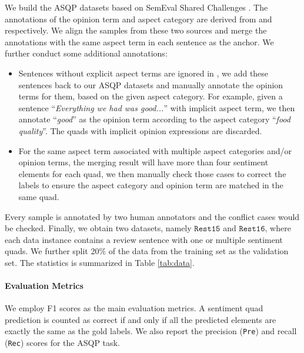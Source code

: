\documentclass[11pt]{article}
\begin{document}
We build the ASQP datasets based on SemEval Shared Challenges \cite{semeval15-absa, semeval16-absa}. The annotations of the opinion term and aspect category are derived from \citet{aaai20-robin} and \citet{aaai20-tasd} respectively. We align the samples from these two sources and merge the annotations with the same aspect term in each sentence as the anchor. We further conduct some additional annotations:
\begin{itemize}[leftmargin=*]
    \setlength{\itemsep}{0pt}
    \setlength{\parsep}{0pt}
    \setlength{\parskip}{0pt}
    \item Sentences without explicit aspect terms are ignored in \citet{aaai20-robin}, we add these sentences back to our ASQP datasets and manually annotate the opinion terms for them, based on the given aspect category. For example, given a sentence ``\textit{Everything we had was good...}'' with implicit aspect term, we then annotate ``\textit{good}'' as the opinion term according to the aspect category ``\textit{food quality}''. The quads with implicit opinion expressions are discarded.
    
    \item For the same aspect term associated with multiple aspect categories and/or opinion terms, the merging result will have more than four sentiment elements for each quad, we then manually check those cases to correct the labels to ensure the aspect category and opinion term are matched in the same quad.   
    
\end{itemize}


Every sample is annotated by two human annotators and the conflict cases would be checked. Finally, we obtain two datasets, namely $\mathtt{Rest15}$ and $\mathtt{Rest16}$, where each data instance contains a review sentence with one or multiple sentiment quads. We further split 20\% of the data from the training set as the validation set. The statistics is summarized in Table \ref{tab:data}.


\paragraph{Evaluation Metrics} We employ F1 scores as the main evaluation metrics. A sentiment quad prediction is counted as correct if and only if all the predicted elements are exactly the same as the gold labels. We also report the precision (\verb|Pre|) and recall (\verb|Rec|) scores for the ASQP task.  
\end{document}
